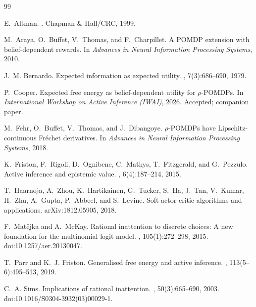 \documentclass[runningheads]{llncs}
\begin{document}
\begin{thebibliography}{99}

E.~Altman.
.
\newblock Chapman \& Hall/CRC, 1999.

M.~Araya, O.~Buffet, V.~Thomas, and F.~Charpillet.
\newblock A {POMDP} extension with belief-dependent rewards.
\newblock In {\em Advances in Neural Information Processing Systems}, 2010.

J.~M. Bernardo.
\newblock Expected information as expected utility.
, 7(3):686--690, 1979.

P.~Cooper.
\newblock Expected free energy as belief-dependent utility for $\rho$-{POMDPs}.
\newblock In {\em International Workshop on Active Inference (IWAI)}, 2026.
\newblock Accepted; companion paper.

M.~Fehr, O.~Buffet, V.~Thomas, and J.~Dibangoye.
\newblock $\rho$-{POMDPs} have {Lipschitz}-continuous {Fr\'echet} derivatives.
\newblock In {\em Advances in Neural Information Processing Systems}, 2018.

K.~Friston, F.~Rigoli, D.~Ognibene, C.~Mathys, T.~Fitzgerald, and G.~Pezzulo.
\newblock Active inference and epistemic value.
, 6(4):187--214, 2015.

T.~Haarnoja, A.~Zhou, K.~Hartikainen, G.~Tucker, S.~Ha, J.~Tan, V.~Kumar, H.~Zhu, A.~Gupta, P.~Abbeel, and S.~Levine.
\newblock Soft actor-critic algorithms and applications.
\newblock arXiv:1812.05905, 2018.

F.~Mat\v{e}jka and A.~McKay.
\newblock Rational inattention to discrete choices: A new foundation for the multinomial logit model.
, 105(1):272--298, 2015.
\newblock doi:10.1257/aer.20130047.

T.~Parr and K.~J. Friston.
\newblock Generalised free energy and active inference.
, 113(5--6):495--513, 2019.

C.~A. Sims.
\newblock Implications of rational inattention.
, 50(3):665--690, 2003.
\newblock doi:10.1016/S0304-3932(03)00029-1.

\end{thebibliography}
\end{document}
